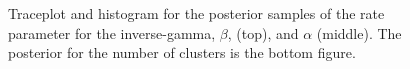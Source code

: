 \documentclass[a4paper, 10pt]{article}
\begin{document}
\begin{enumerate}
\begin{figure}[h!]
        \caption{Traceplot and histogram for the posterior samples of the rate parameter for the inverse-gamma, $\beta$, (top), and $\alpha$ (middle). The posterior for the number of clusters is the bottom figure.}
        \label{prob3_fig}
    \end{figure}
    
\end{enumerate}
\end{document}
